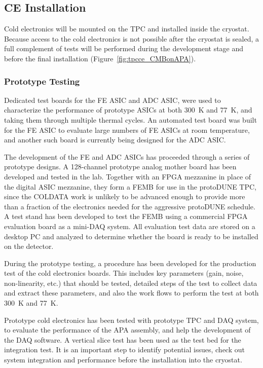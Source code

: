 %
\subsection{CE Installation}
\label{subsec:ce_install}

Cold electronics will be mounted on the TPC and installed inside the cryostat.
Because access to the cold electronics is not possible after the cryostat is sealed,
a full complement of tests will be performed during the development stage and before the final installation
(Figure~\ref{fig:tpcce_CMBonAPA}).

\subsubsection{Prototype Testing}
\label{subsubsec:ce_install_proto}

Dedicated test boards for the FE ASIC and ADC ASIC,
were used to characterize the performance of prototype ASICs at both 300~K and 77~K,
and taking them through multiple thermal cycles.
An automated test board was built for the FE ASIC to evaluate large numbers of FE ASICs at room temperature,
and another such board is currently being designed for the ADC ASIC.

The development of the FE and ADC ASICs has proceeded through a series of prototype designs.
A 128-channel prototype analog mother board has been developed and tested in the lab.
Together with an FPGA mezzanine in place of the digital ASIC mezzanine,
they form a FEMB for use in the protoDUNE TPC,
since the COLDATA work is unlikely to be advanced enough to
provide more than a fraction of the electronics needed for the aggressive protoDUNE schedule.
A test stand has been developed to test the FEMB
using a commercial FPGA evaluation board as a mini-DAQ system.
All evaluation test data are stored on a desktop PC and analyzed to
determine whether the board is ready to be installed on the detector.

During the prototype testing, a procedure has been developed for the production test of the cold electronics boards.
This includes key parameters (gain, noise, non-linearity, etc.) that should be tested,
detailed steps of the test to collect data and extract these parameters,
and also the work flows to perform the test at both 300~K and 77~K.

Prototype cold electronics has been tested with prototype TPC and DAQ system,
to evaluate the performance of the APA assembly, and help the development of the DAQ software.
A vertical slice test has been used as the test bed for the integration test.
It is an important step to identify potential issues, check out system integration and performance
before the installation into the cryostat.

